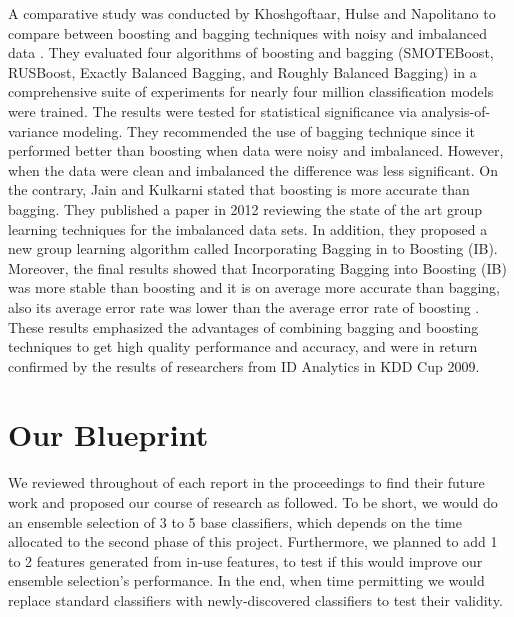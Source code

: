 \documentclass[journal]{IEEEtran}
\begin{document}
A comparative study was conducted by Khoshgoftaar, Hulse and Napolitano to compare between boosting and bagging techniques with noisy and imbalanced data \cite{Ref:ComparingBoostingandBaggingWithNoisyImbalancedData}. They evaluated four algorithms of boosting and bagging (SMOTEBoost, RUSBoost, Exactly Balanced Bagging, and Roughly Balanced Bagging) in a comprehensive suite of experiments for nearly four million classification models were trained. The results were tested for statistical significance via analysis-of-variance modeling. They recommended the use of bagging technique since it performed better than boosting when data were noisy and imbalanced. However, when the data were clean and imbalanced the difference was less significant. On the contrary, Jain and Kulkarni stated that boosting is more accurate than bagging. They published a paper in 2012 reviewing the state of the art group learning techniques for the imbalanced data sets. In addition, they proposed a new group learning algorithm called Incorporating Bagging in to Boosting (IB). Moreover, the final results showed that Incorporating Bagging into Boosting (IB) was more stable than boosting and it is on average more accurate than bagging, also its average error rate was lower than the average error rate of boosting \cite{Ref:IncoprtatingBaggingIntoBoosting}. These results emphasized the advantages of combining bagging and boosting techniques to get high quality performance and accuracy, and were in return confirmed by the results of researchers from ID Analytics in KDD Cup 2009.

\section{Our Blueprint}\label{Sec:Our Research Methods}



We reviewed throughout of each report in the proceedings \cite{Ref:ProceedingsOfKddCup2009} to find their future work and proposed our course of research as followed. To be short, we would do an ensemble selection of 3 to 5 base classifiers, which depends on the time allocated to the second phase of this project. Furthermore, we planned to add 1 to 2 features generated from in-use features, to test if this would improve our ensemble selection's performance. In the end, when time permitting we would replace standard classifiers with newly-discovered classifiers to test their validity.
\end{document}
